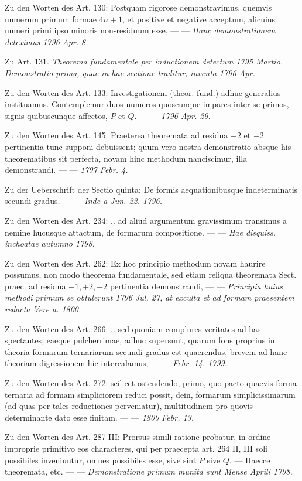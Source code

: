 Zu den Worten des Art. 130: Postquam rigorose demonstravimus, quemvis numerum primum formae \(4n+1\), et positive et negative acceptum, alicuius numeri primi ipso minoris non-residuum esse, — — \textit{Hanc demonstrationem deteximus 1796 Apr. 8.}


Zu Art. 131. \textit{Theorema fundamentale per inductionem detectum 1795 Martio. Demonstratio prima, quae in hac sectione traditur, inventa 1796 Apr.}



Zu den Worten des Art. 133: Investigationem (theor. fund.) adhuc generalius instituamus. Contemplemur duos numeros quoscunque impares inter se primos, signis quibuscunque affectos, \(P\) et \(Q\). — — \textit{1796 Apr. 29.}


Zu den Worten des Art. 145: Praeterea theoremata ad residua \(+2\) et \(-2\) pertinentia tunc supponi debuissent; quum vero nostra demonstratio absque his theorematibus sit perfecta, novam hinc methodum nanciscimur, illa demonstrandi. — — \textit{1797 Febr. 4.}


Zu der Ueberschrift der Sectio quinta: De formis aequationibusque indeterminatis secundi gradus. — — \textit{Inde a Jun. 22. 1796.}


Zu den Worten des Art. 234: .. ad aliud argumentum gravissimum transimus a nemine hucusque attactum, de formarum compositione. — — \textit{Hae disquiss. inchoatae autumno 1798.}


Zu den Worten des Art. 262: Ex hoc principio methodum novam haurire possumus, non modo theorema fundamentale, sed etiam reliqua theoremata Sect. praec. ad residua \(-1,\allowbreak +2,\allowbreak -2\) pertinentia demonstrandi, — — \textit{Principia huius methodi primum se obtulerunt 1796 Jul. 27, at exculta et ad formam praesentem redacta Vere a. 1800.}


Zu den Worten des Art. 266: .. sed quoniam complures veritates ad has spectantes, eaeque pulcherrimae, adhuc supersunt, quarum fons proprius in theoria formarum ternariarum secundi gradus est quaerendus, brevem ad hanc theoriam digressionem hic intercalamus, — — \textit{Febr. 14. 1799.}


Zu den Worten des Art. 272: scilicet ostendendo, primo, quo pacto quaevis forma ternaria ad formam simpliciorem reduci possit, dein, formarum simplicissimarum (ad quas per tales reductiones perveniatur), multitudinem pro quovis determinante dato esse finitam. — — \textit{1800 Febr. 13.}


Zu den Worten des Art. 287 III: Prorsus simili ratione probatur, in ordine improprie primitivo eos characteres, qui per praecepta art. 264 II, III soli possibiles inveniuntur, omnes possibiles esse, sive sint \(P\) sive \(Q\). — Haecce theoremata, etc. — — \textit{Demonstratione primum munita sunt Mense Aprili 1798.}


